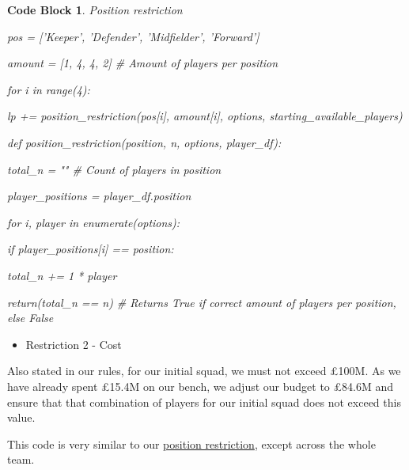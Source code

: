 \documentclass[12pt, a4paper, oneside]{book}
\newtheorem{codeblock}[theorem]{Code Block}
\numberwithin{equation}{section}
\begin{document}
\begin{codeblock} \label{position restriction}
  Position restriction

  pos = ['Keeper', 'Defender', 'Midfielder', 'Forward']

  amount = [1, 4, 4, 2] \# Amount of players per position

  for i in range(4):

  \hspace{\parindent}lp += position\_restriction(pos[i], amount[i], options, starting\_available\_players)

  def position\_restriction(position, n, options, player\_df):

  \hspace{\parindent}total\_n = "" \# Count of players in position
    
  \hspace{\parindent}player\_positions = player\_df.position
    
  \hspace{\parindent}for i, player in enumerate(options):
    
  \hspace{\parindent}\hspace{\parindent}if player\_positions[i] == position:
    
  \hspace{\parindent}\hspace{\parindent}\hspace{\parindent}total\_n += 1 * player
            
  \hspace{\parindent}return(total\_n == n) \# Returns True if correct amount of players per position, else False
\end{codeblock}

\vspace{0.5cm}

\begin{itemize}
  \item Restriction 2 - Cost
\end{itemize}

Also stated in our rules, for our initial squad, we must not exceed £100M. As we have already spent £15.4M on our bench, we adjust our budget to £84.6M and ensure that that combination of players for our initial squad does not exceed this value.

This code is very similar to our \hyperref[position restriction]{position restriction}, except across the whole team.
\end{document}
